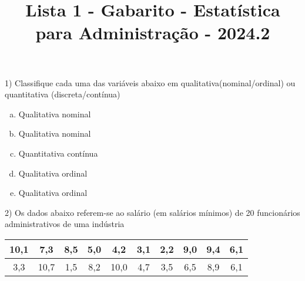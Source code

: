 \documentclass{article}
\title{Lista 1 - Gabarito - Estatística para Administração - 2024.2}
\begin{document}
\date{}
\maketitle

1) Classifique cada uma das variáveis abaixo em qualitativa(nominal/ordinal) ou quantitativa (discreta/contínua)

\begin{enumerate}[a)] %
\item Qualitativa nominal
\item Qualitativa nominal
\item Quantitativa contínua
\item Qualitativa ordinal
\item Qualitativa ordinal
\end{enumerate}

2) Os dados abaixo referem-se ao salário (em salários mínimos) de 20 funcionários administrativos de uma indústria
\begin{table}[H]
\centering
\begin{tabular}{|c|c|c|c|c|c|c|c|c|c|}
\hline
10,1 & 7,3  & 8,5 & 5,0 & 4,2  & 3,1 & 2,2 & 9,0 & 9,4 & 6,1 \\ \hline
3,3  & 10,7 & 1,5 & 8,2 & 10,0 & 4,7 & 3,5 & 6,5 & 8,9 & 6,1 \\ \hline
\end{tabular}
\end{table}
\end{document}
